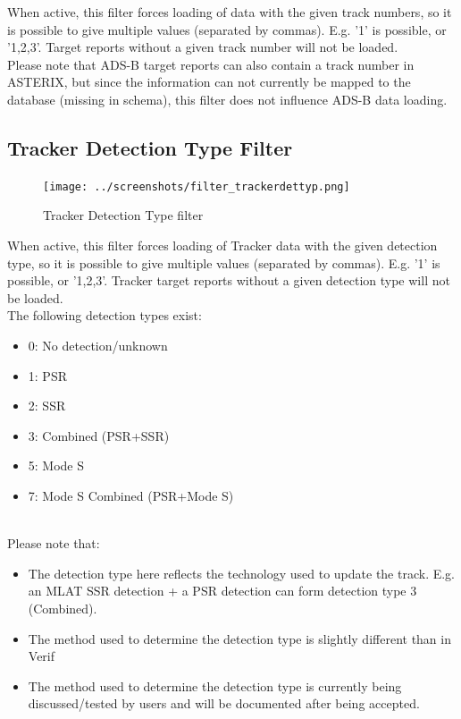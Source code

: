 When active, this filter forces loading of data with the given track numbers, so it is possible to give multiple values (separated by commas). E.g. '1' is possible, or '1,2,3'. Target reports without a given track number will not be loaded. \\

Please note that ADS-B target reports can also contain a track number in ASTERIX, but since the information can not currently be mapped to the database (missing in schema), this filter does not influence ADS-B data loading.

\subsection{Tracker Detection Type Filter}

\begin{figure}[H]
  \center
    \texttt{[image: ../screenshots/filter\_trackerdettyp.png]}
  \caption{Tracker Detection Type filter}
\end{figure}

When active, this filter forces loading of Tracker data with the given detection type, so it is possible to give multiple values (separated by commas). E.g. '1' is possible, or '1,2,3'. Tracker target reports without a given detection type will not be loaded. \\

The following detection types exist:
\begin{itemize}
 \item 0: No detection/unknown
 \item 1: PSR
 \item 2: SSR
 \item 3: Combined (PSR+SSR)
 \item 5: Mode S
 \item 7: Mode S Combined (PSR+Mode S)
\end{itemize}
\  \\

Please note that:
\begin{itemize}
 \item The detection type here reflects the technology used to update the track. E.g. an MLAT SSR detection + a PSR detection can form detection type 3 (Combined).
 \item The method used to determine the detection type is slightly different than in Verif
 \item The method used to determine the detection type is currently being discussed/tested by users and will be documented after being accepted.
\end{itemize}

